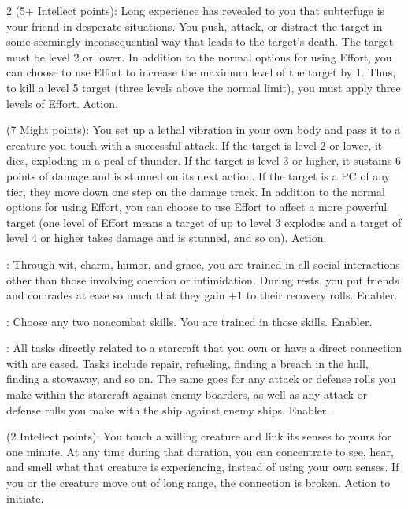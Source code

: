 \begin{multicols}{2}
 (5+ Intellect points): Long experience has revealed to you that subterfuge is your friend in desperate situations. You push, attack, or distract the target in some seemingly inconsequential way that leads to the target’s death. The target must be level 2 or lower. In addition to the normal options for using Effort, you can choose to use Effort to increase the maximum level of the target by 1. Thus, to kill a level 5 target (three levels above the normal limit), you must apply three levels of Effort. Action. 
 
 (7 Might points): You set up a lethal vibration in your own body and pass it to a creature you touch with a successful attack. If the target is level 2 or lower, it dies, exploding in a peal of thunder. If the target is level 3 or higher, it sustains 6 points of damage and is stunned on its next action. If the target is a PC of any tier, they move down one step on the damage track. In addition to the normal options for using Effort, you can choose to use Effort to affect a more powerful target (one level of Effort means a target of up to level 3 explodes and a target of level 4 or higher takes damage and is stunned, and so on). Action.
 
: Through wit, charm, humor, and grace, you are trained in all social interactions other than those involving coercion or intimidation. During rests, you put friends and comrades at ease so much that they gain +1 to their recovery rolls. Enabler. 
 
: Choose any two noncombat skills. You are trained in those skills. Enabler. 
 
: All tasks directly related to a starcraft that you own or have a direct connection with are eased. Tasks include repair, refueling, finding a breach in the hull, finding a stowaway, and so on. The same goes for any attack or defense rolls you make within the starcraft against enemy boarders, as well as any attack or defense rolls you make with the ship against enemy ships. Enabler. 
 
 (2 Intellect points): You touch a willing creature and link its senses to yours for one minute. At any time during that duration, you can concentrate to see, hear, and smell what that creature is experiencing, instead of using your own senses. If you or the creature move out of long range, the connection is broken. Action to initiate. 
 

\end{multicols}
